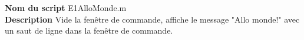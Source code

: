 \textbf{Nom du script}
E1AlloMonde.m\\
\textbf{Description}
Vide la fenêtre de commande, affiche le message "Allo monde!" avec un saut de ligne dans la fenêtre de commande.